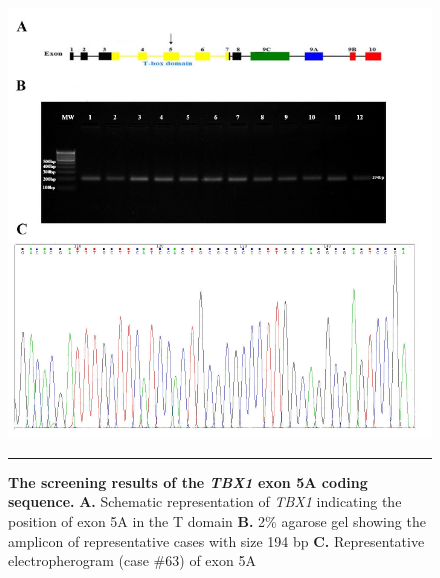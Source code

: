 \begin{refsection}
\begin{figure}[!thb]
\centering
\includegraphics[width=\linewidth]{Figures/Figure4_5TBX5A.pdf}
\rule{35em}{0.5pt}
\caption[The screening results of the \textit{TBX1} exon 5A coding sequence]{\textbf{The screening results of the \textit{TBX1} exon 5A coding sequence.}
\textbf{A.} Schematic representation of \textit{TBX1} indicating the position of exon 5A in the T domain 
\textbf{B.} 2\% agarose gel showing the amplicon of representative cases with size 194 bp \textbf{C.} Representative electropherogram (case \#63) of exon 5A}
\label{fig:4_5}
\end{figure}


\end{refsection}
